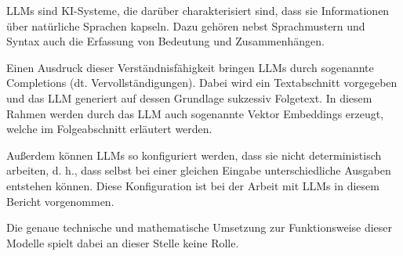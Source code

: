 \documentclass[../main.tex]{subfiles}
\begin{document}
\glspl{LLM} sind KI-Systeme, die darüber charakterisiert sind, dass sie Informationen über natürliche Sprachen kapseln.
Dazu gehören nebst Sprachmustern und Syntax auch die Erfassung von Bedeutung und Zusammenhängen.
\cite{zheng2023large}

Einen Ausdruck dieser Verständnisfähigkeit bringen \glspl{LLM} durch sogenannte Completions (dt. Vervollständigungen).
Dabei wird ein Textabschnitt vorgegeben und das \gls{LLM} generiert auf dessen Grundlage sukzessiv Folgetext.
In diesem Rahmen werden durch das \gls{LLM} auch sogenannte Vektor Embeddings erzeugt, welche im Folgeabschnitt erläutert werden.
\cite{naveed2023comprehensive}

Außerdem können \glspl{LLM} so konfiguriert werden, dass sie nicht deterministisch arbeiten, d. h., dass selbst bei einer gleichen Eingabe unterschiedliche Ausgaben entstehen können.
Diese Konfiguration ist bei der Arbeit mit \glspl{LLM} in diesem Bericht vorgenommen.

Die genaue technische und mathematische Umsetzung zur Funktionsweise dieser Modelle spielt dabei an dieser Stelle keine Rolle.
\end{document}
